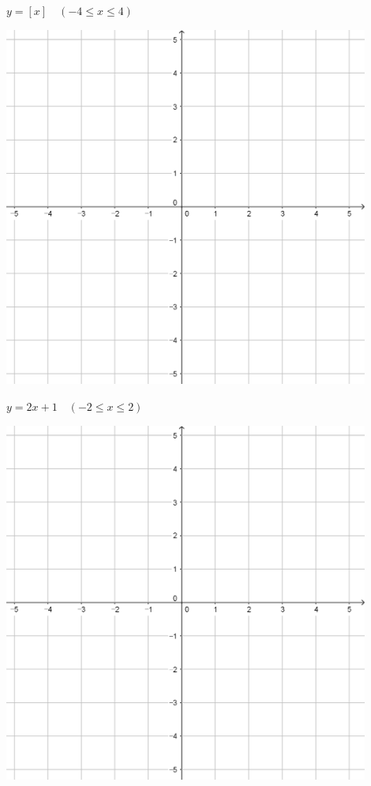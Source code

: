 \documentclass[a4paper]{oblivoir}
\begin{document}
\begin{minipage}{0.45\textwidth}\centering
\(y=[x]\quad(-4\le x\le4)\)
\par\bigskip\includegraphics[width=0.9\textwidth]{55}
\end{minipage}\bigskip\bigskip\par
\begin{minipage}{0.45\textwidth}\centering
\(y=2x+1\quad(-2\le x\le2)\)
\par\bigskip\includegraphics[width=0.9\textwidth]{55}
\end{minipage}
\end{document}
